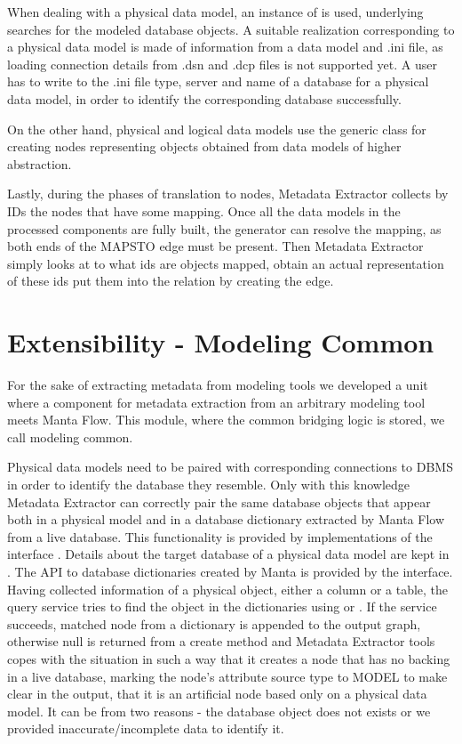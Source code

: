 When dealing with a physical data model, an instance of  is used, underlying  searches for the modeled database objects. 
A suitable  realization corresponding to a physical data model is made of information from a data model and .ini file, as loading connection details from .dsn and .dcp files is not supported yet. A user has to write to the .ini file type, server and name of a database for a physical data model, in order to identify the corresponding database successfully.

On the other hand, physical and logical data models use the generic  class for creating nodes representing objects obtained from data models of higher abstraction.

Lastly, during the phases of translation to nodes, Metadata Extractor collects by IDs the nodes that have some mapping.
Once all the data models in the processed components are fully built, the generator can resolve the mapping, as both ends of the MAPS\textunderscore TO edge must be present. 
Then Metadata Extractor simply looks at to what ids are objects mapped, obtain an actual representation of these ids put them into the relation by creating the edge.

\section{Extensibility - Modeling Common}
\label{modeling_common}

For the sake of extracting metadata from modeling tools we developed a unit where a component for metadata extraction from an arbitrary modeling tool meets Manta Flow.
This module, where the common bridging logic is stored, we call modeling common.

Physical data models need to be paired with corresponding connections to DBMS in order to identify the database they resemble. 
Only with this knowledge Metadata Extractor can correctly pair the same database objects that appear both in a physical model and in a database dictionary extracted by Manta Flow from a live database. 
This functionality is provided by implementations of the interface . Details about the target database of a physical data model are kept in . 
The API to database dictionaries created by Manta is provided by the  interface. 
Having collected information of a physical object, either a column or a table, the query service tries to find the object in the dictionaries using  or . 
If the service succeeds, matched node from a dictionary is appended to the output graph, otherwise null is returned from a create method and Metadata Extractor tools copes with the situation in such a way that it creates a node that has no backing in a live database, marking the node's attribute source type to MODEL to make clear in the output, that it is an artificial node based only on a physical data model. 
It can be from two reasons - the database object does not exists or we provided inaccurate/incomplete data to identify it.

